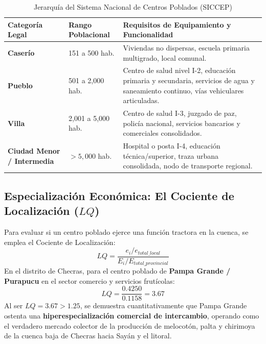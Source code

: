 \documentclass[11pt,a4paper]{article}
\begin{document}
\begin{table}[htbp]
\centering
\small
\caption{Jerarquía del Sistema Nacional de Centros Poblados (SICCEP)}
\begin{tabularx}{\textwidth}{p{3.5cm}p{3cm}X}
\toprule
\textbf{Categoría Legal} & \textbf{Rango Poblacional} & \textbf{Requisitos de Equipamiento y Funcionalidad} \\
\midrule
\textbf{Caserío} & 151 a 500 hab. & Viviendas no dispersas, escuela primaria multigrado, local comunal. \\
\addlinespace
\textbf{Pueblo} & 501 a 2,000 hab. & Centro de salud nivel I-2, educación primaria y secundaria, servicios de agua y saneamiento continuo, vías vehiculares articuladas. \\
\addlinespace
\textbf{Villa} & 2,001 a 5,000 hab. & Centro de salud I-3, juzgado de paz, policía nacional, servicios bancarios y comerciales consolidados. \\
\addlinespace
\textbf{Ciudad Menor / Intermedia} & $> 5,000$ hab. & Hospital o posta I-4, educación técnica/superior, traza urbana consolidada, nodo de transporte regional. \\
\bottomrule
\end{tabularx}
\end{table}

\subsection{Especialización Económica: El Cociente de Localización ($LQ$)}
Para evaluar si un centro poblado ejerce una función tractora en la cuenca, se emplea el Cociente de Localización:
\begin{equation}
    LQ = \frac{e_i / e_{total\_local}}{E_i / E_{total\_provincial}}
\end{equation}
En el distrito de Checras, para el centro poblado de \textbf{Pampa Grande / Purapucu} en el sector comercio y servicios frutícolas:
\begin{equation}
    LQ = \frac{0.4250}{0.1158} = 3.67
\end{equation}
Al ser $LQ = 3.67 > 1.25$, se demuestra cuantitativamente que Pampa Grande ostenta una \textbf{hiperespecialización comercial de intercambio}, operando como el verdadero mercado colector de la producción de melocotón, palta y chirimoya de la cuenca baja de Checras hacia Sayán y el litoral.
\end{document}
